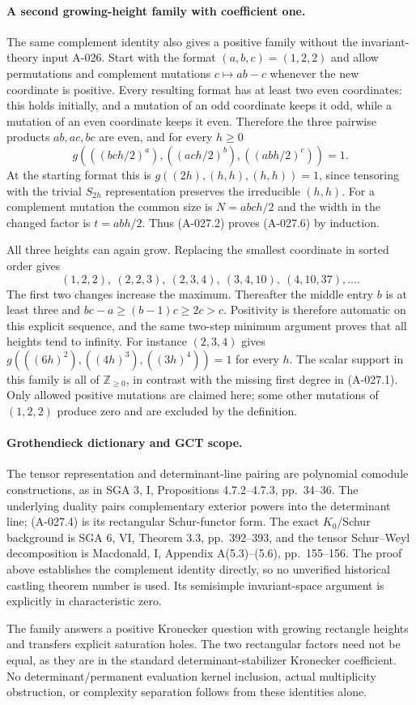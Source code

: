 \paragraph{A second growing-height family with coefficient one.}
The same complement identity also gives a positive family
without the invariant-theory input A-026. Start with the
format $(a,b,c)=(1,2,2)$ and allow permutations and
complement mutations $c\mapsto ab-c$ whenever the new
coordinate is positive. Every resulting format has at least
two even coordinates: this holds initially, and a mutation
of an odd coordinate keeps it odd, while a mutation of an
even coordinate keeps it even. Therefore the three pairwise
products $ab,ac,bc$ are even, and for every $h\geq0$
\[
       g\left(((bch/2)^a),((ach/2)^b),((abh/2)^c)\right)=1.
                                                               \tag{A-027.6}
\]
At the starting format this is
$g((2h),(h,h),(h,h))=1$, since tensoring with the trivial
$S_{2h}$ representation preserves the irreducible $(h,h)$.
For a complement mutation the common size is $N=abc h/2$
and the width in the changed factor is $t=ab h/2$.
Thus (A-027.2) proves (A-027.6) by induction.

All three heights can again grow. Replacing the smallest
coordinate in sorted order gives
\[
              (1,2,2),\ (2,2,3),\ (2,3,4),\ (3,4,10),\ (4,10,37),\ldots.
\]
The first two changes increase the maximum. Thereafter the
middle entry $b$ is at least three and
$bc-a\geq(b-1)c\geq2c>c$. Positivity is therefore
automatic on this explicit sequence, and the same two-step
minimum argument proves that all heights tend to infinity.
For instance $(2,3,4)$ gives
$g(((6h)^2),((4h)^3),((3h)^4))=1$ for every $h$.
The scalar support in this family is all of
$\mathbb Z_{\geq0}$, in contrast with the missing first
degree in (A-027.1). Only allowed positive mutations are
claimed here; some other mutations of $(1,2,2)$ produce zero
and are excluded by the definition.

\paragraph{Grothendieck dictionary and GCT scope.}
The tensor representation and determinant-line pairing are
polynomial comodule constructions, as in SGA 3, I,
Propositions 4.7.2--4.7.3, pp.~34--36. The underlying
duality pairs complementary exterior powers into the
determinant line; (A-027.4) is its rectangular Schur-functor
form. The exact $K_0$/Schur background is SGA 6, VI,
Theorem 3.3, pp.~392--393, and the tensor Schur--Weyl
decomposition is Macdonald, I, Appendix A(5.3)--(5.6),
pp.~155--156. The proof above establishes the complement
identity directly, so no unverified historical castling
theorem number is used. Its semisimple invariant-space
argument is explicitly in characteristic zero.

The family answers a positive Kronecker question with
growing rectangle heights and transfers explicit saturation
holes. The two rectangular factors need not be equal,
as they are in the standard determinant-stabilizer
Kronecker coefficient. No determinant/permanent evaluation
kernel inclusion, actual multiplicity obstruction, or
complexity separation follows from these identities alone.
